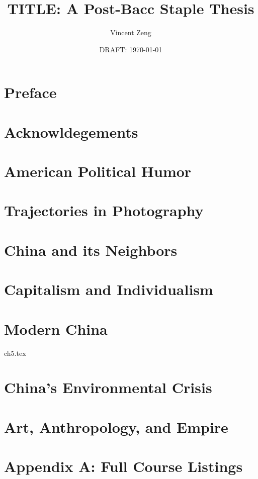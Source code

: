 \documentclass{book}[10pt,openany,twoside]
\begin{document}
\title{TITLE: A Post-Bacc Staple Thesis}
\author{Vincent Zeng}
\date{DRAFT: \today}


\frontmatter

\maketitle
\tableofcontents

\chapter{Preface}


\chapter{Acknowldegements}



\mainmatter

\chapter{American Political Humor}


\chapter{Trajectories in Photography}


\chapter{China and its Neighbors}


\chapter{Capitalism and Individualism}


\chapter{Modern China}
 {ch5.tex}

\chapter{China's Environmental Crisis}


\chapter{Art, Anthropology, and Empire}


\backmatter

\chapter{Appendix A: Full Course Listings}

\end{document}
